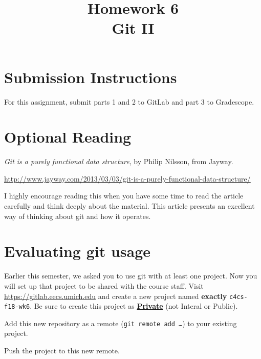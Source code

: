 \documentclass{article}
\begin{document}
\fancyhead[L]{}
\fancyhead[R]{}

\fancyfoot[C]{\color{gray} \thepage~/~\pageref*{LastPage}}
\pagestyle{fancyplain}

\title{\textbf{Homework 6\\Git II}}
\author{\textbf{\color{red}{Due: Wednesday, October 24th, 11:59PM (Hard Deadline)}}}
\date{}
\maketitle


\section*{Submission Instructions}
For this assignment, submit parts 1 and 2 to GitLab and part 3 to Gradescope.


\section*{Optional Reading}

\emph{Git is a purely functional data structure}, by Philip Nilsson, from Jayway.

\url{http://www.jayway.com/2013/03/03/git-is-a-purely-functional-data-structure/}

I highly encourage reading this when you have some time to read the article
carefully and think deeply about the material.
This article presents an excellent way of thinking about git and how it
operates.



\section{Evaluating git usage}

Earlier this semester, we asked you to use git with at least one project. Now
you will set up that project to be shared with the course staff. Visit
\url{https://gitlab.eecs.umich.edu} and create a new project named
\textbf{exactly} \texttt{c4cs-f18-wk6}.
Be sure to create this project as
\textbf{\ul{Private}} (not Interal or Public).

Add this new repository as a remote (\texttt{git remote add \dots}) to your
existing project.

Push the project to this new remote.
\end{document}
